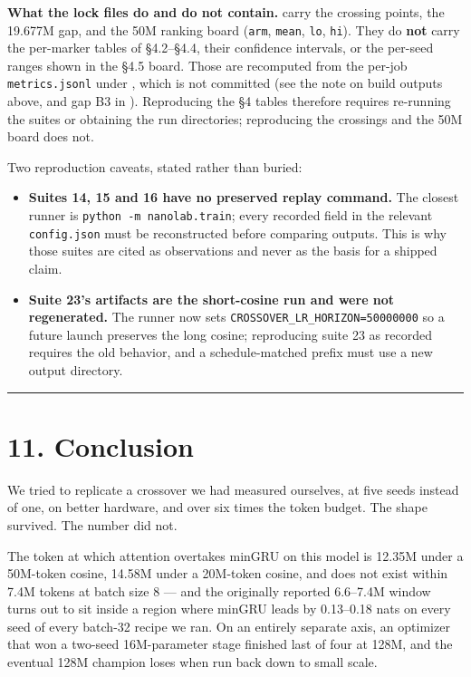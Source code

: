 \textbf{What the lock files do and do not contain.} 
carry the crossing points, the 19.677M gap, and the 50M ranking board (\texttt{arm}, \texttt{mean}, \texttt{lo}, \texttt{hi}).
They do \textbf{not} carry the per-marker tables of \S4.2--\S4.4, their confidence intervals, or the
per-seed ranges shown in the \S4.5 board. Those are recomputed from the per-job \texttt{metrics.jsonl}
under , which is not committed (see the note on build outputs above, and gap B3 in
). Reproducing the \S4 tables therefore requires re-running the
suites or obtaining the run directories; reproducing the crossings and the 50M board does not.

Two reproduction caveats, stated rather than buried:

\begin{itemize}
\tightlist
\item
  \textbf{Suites 14, 15 and 16 have no preserved replay command.} The closest runner is
  \texttt{python\ -m\ nanolab.train}; every recorded field in the relevant \texttt{config.json} must be
  reconstructed before comparing outputs. This is why those suites are cited as observations and
  never as the basis for a shipped claim.
\item
  \textbf{Suite 23's artifacts are the short-cosine run and were not regenerated.} The runner now sets
  \texttt{CROSSOVER\_LR\_HORIZON=50000000} so a future launch preserves the long cosine; reproducing
  suite 23 as recorded requires the old behavior, and a schedule-matched prefix must use a new
  output directory.
\end{itemize}

\begin{center}\rule{0.5\linewidth}{0.5pt}\end{center}

\section{11. Conclusion}\label{conclusion}

We tried to replicate a crossover we had measured ourselves, at five seeds instead of one, on
better hardware, and over six times the token budget. The shape survived. The number did not.

The token at which attention overtakes minGRU on this model is 12.35M under a 50M-token cosine,
14.58M under a 20M-token cosine, and does not exist within 7.4M tokens at batch size 8 --- and the
originally reported 6.6--7.4M window turns out to sit inside a region where minGRU leads by
0.13--0.18 nats on every seed of every batch-32 recipe we ran. On an entirely separate axis, an
optimizer that won a two-seed 16M-parameter stage finished last of four at 128M, and the eventual
128M champion loses when run back down to small scale.

